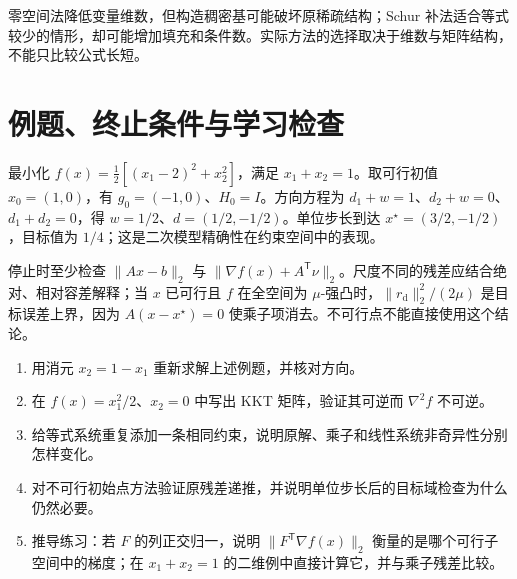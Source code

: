零空间法降低变量维数，但构造稠密基可能破坏原稀疏结构；Schur 补法适合等式较少的情形，却可能增加填充和条件数。实际方法的选择取决于维数与矩阵结构，不能只比较公式长短。

\section{例题、终止条件与学习检查}
\begin{example}[守恒约束下的一步牛顿]
最小化 $f(x)=\tfrac12[(x_1-2)^2+x_2^2]$，满足 $x_1+x_2=1$。取可行初值 $x_0=(1,0)$，有 $g_0=(-1,0)$、$H_0=I$。方向方程为 $d_1+w=1$、$d_2+w=0$、$d_1+d_2=0$，得 $w=1/2$、$d=(1/2,-1/2)$。单位步长到达 $x^\star=(3/2,-1/2)$，目标值为 $1/4$；这是二次模型精确性在约束空间中的表现。
\end{example}

停止时至少检查 $\|Ax-b\|_2$ 与 $\|\nabla f(x)+A^{\mathsf T}\nu\|_2$。尺度不同的残差应结合绝对、相对容差解释；当 $x$ 已可行且 $f$ 在全空间为 $\mu$-强凸时，$\|r_{\mathrm d}\|_2^2/(2\mu)$ 是目标误差上界，因为 $A(x-x^\star)=0$ 使乘子项消去。不可行点不能直接使用这个结论。

\begin{enumerate}
 \item 用消元 $x_2=1-x_1$ 重新求解上述例题，并核对方向。
 \item 在 $f(x)=x_1^2/2$、$x_2=0$ 中写出 KKT 矩阵，验证其可逆而 $\nabla^2f$ 不可逆。
 \item 给等式系统重复添加一条相同约束，说明原解、乘子和线性系统非奇异性分别怎样变化。
 \item 对不可行初始点方法验证原残差递推，并说明单位步长后的目标域检查为什么仍然必要。
 \item 推导练习：若 $F$ 的列正交归一，说明 $\|F^{\mathsf T}\nabla f(x)\|_2$ 衡量的是哪个可行子空间中的梯度；在 $x_1+x_2=1$ 的二维例中直接计算它，并与乘子残差比较。
\end{enumerate}

